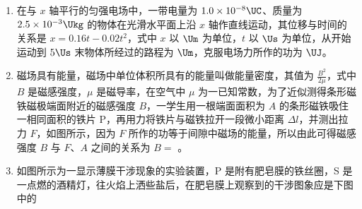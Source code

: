 \documentclass[\gkver]{gaokaozhenti}
\begin{document}
\begin{enumerate}
\item
在与 $x$ 轴平行的匀强电场中，一带电量为 $1.0\times10^{-8}\UC$、质量为 $2.5\times10^{-3}\Ukg$ 的物体在光滑水平面上沿 $x$ 轴作直线运动，其位移与时间的关系是 $x=0.16t-0.02t^{2}$，式中 $x$ 以 $\Um$ 为单位，$t$ 以 $\Us$ 为单位，从开始运动到 $5\Us$ 末物体所经过的路程为  $\Um$，克服电场力所作的功为  $\UJ$。



\item
磁场具有能量，磁场中单位体积所具有的能量叫做能量密度，其值为 $\frac{B^{2}}{2\mu}$，式中 $B$ 是磁感强度，$\mu$ 是磁导率，在空气中 $\mu$ 为一已知常数，为了近似测得条形磁铁磁极端面附近的磁感强度 $B$，一学生用一根端面面积为 $A$ 的条形磁铁吸住一相同面积的铁片 P，再用力将铁片与磁铁拉开一段微小距离 $\Delta l$，并测出拉力 $F$，如图所示，因为 $F$ 所作的功等于间隙中磁场的能量，所以由此可得磁感强度 $B$ 与 $F$、$A$ 之间的关系为 $B=$ 。

\onepicture[align=right, w=5.53cm]{}



\item
如图所示为一显示薄膜干涉现象的实验装置，P 是附有肥皂膜的铁丝圈，S 是一点燃的酒精灯，往火焰上洒些盐后，在肥皂膜上观察到的干涉图象应是下图中的


\end{enumerate}
\end{document}
